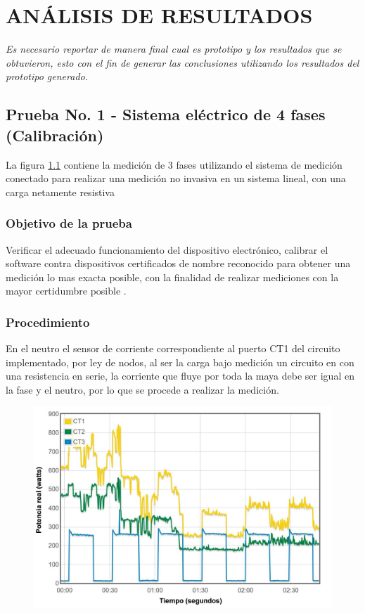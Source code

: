 

\chapter{ ANÁLISIS DE RESULTADOS }

\textit{Es necesario reportar de manera final cual es prototipo y los resultados que se obtuvieron, esto con el fin de generar las conclusiones utilizando los resultados del prototipo generado.}

\section{ Prueba No. 1 - Sistema eléctrico de 4 fases (Calibración)}

La figura \ref{Graficas} contiene la medición de 3 fases utilizando el sistema de medición conectado para realizar una medición no invasiva en un sistema lineal, con una carga netamente resistiva

\subsection{ Objetivo de la prueba}

Verificar el adecuado funcionamiento del dispositivo electrónico, calibrar el software contra dispositivos certificados de nombre reconocido para obtener una medición lo mas exacta posible, con la finalidad de realizar mediciones con la mayor certidumbre posible \cite{NOM}.

\subsection{ Procedimiento}

En el neutro el sensor de corriente correspondiente al puerto CT1 del circuito implementado, por ley de nodos, al ser la carga bajo medición un circuito en con una resistencia en serie, la corriente que fluye por toda la maya debe ser igual en la fase y el neutro, por lo que se procede a realizar la medición.

\begin{figure}[H]
	\begin{center}
 		\includegraphics[width = .85\textwidth]{Tesis/Imagenes/Grafica.JPG}
	\label{Graficas}
    \end{center} 
\end{figure}



